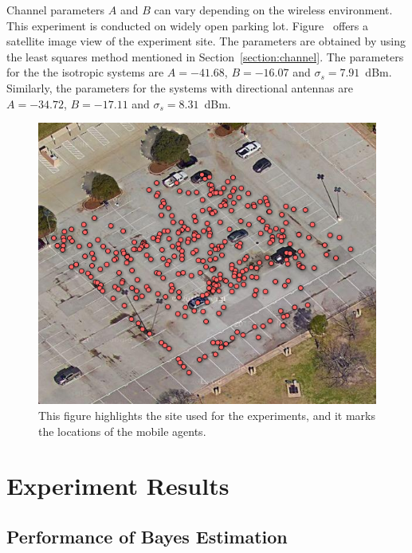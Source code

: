 Channel parameters $A$ and $B$ can vary depending on the wireless environment.
This experiment is conducted on widely open parking lot.
Figure~\label{figure:Googlemap} offers a satellite image view of the experiment site.
The parameters are obtained by using the least squares method mentioned in Section~\ref{section:channel}.
The parameters for the the isotropic systems are $A = -41.68$, $B = -16.07$ and $\sigma_{s} = 7.91$~dBm.
Similarly, the parameters for the systems with directional antennas are $A = -34.72$, $B = -17.11$ and $\sigma_{s} = 8.31$~dBm.
\begin{figure}[]
	\centering
	\includegraphics[scale=1]{Figures/Googlemap.png}
	\caption{This figure highlights the site used for the experiments, and it marks the locations of the mobile agents.}
	\label{figure:Googlemap}
\end{figure}


\section{Experiment Results}
\subsection{Performance of Bayes Estimation}

